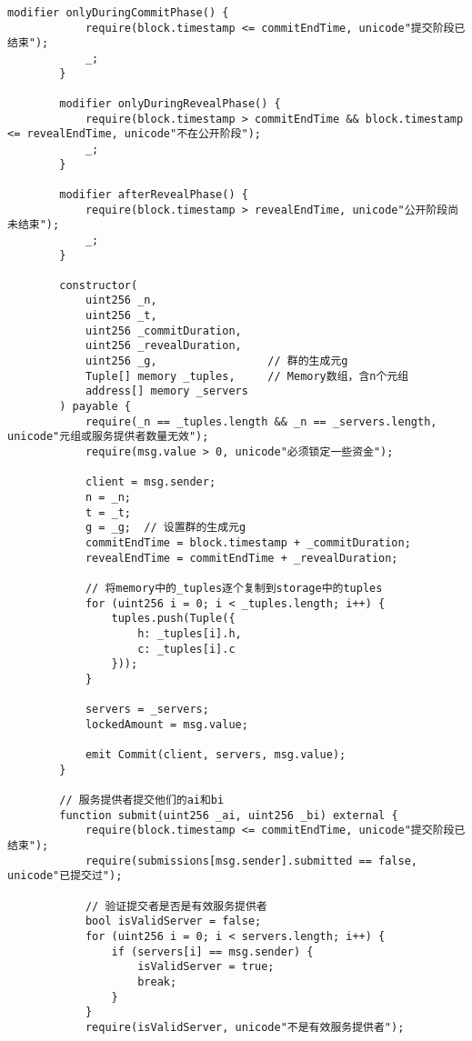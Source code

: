 \begin{lstlisting}[language=Solidity]
        modifier onlyDuringCommitPhase() {
            require(block.timestamp <= commitEndTime, unicode"提交阶段已结束");
            _;
        }
    
        modifier onlyDuringRevealPhase() {
            require(block.timestamp > commitEndTime && block.timestamp <= revealEndTime, unicode"不在公开阶段");
            _;
        }
    
        modifier afterRevealPhase() {
            require(block.timestamp > revealEndTime, unicode"公开阶段尚未结束");
            _;
        }
    
        constructor(
            uint256 _n,
            uint256 _t,
            uint256 _commitDuration,
            uint256 _revealDuration,
            uint256 _g,                 // 群的生成元g
            Tuple[] memory _tuples,     // Memory数组，含n个元组
            address[] memory _servers
        ) payable {
            require(_n == _tuples.length && _n == _servers.length, unicode"元组或服务提供者数量无效");
            require(msg.value > 0, unicode"必须锁定一些资金");
    
            client = msg.sender;
            n = _n;
            t = _t;
            g = _g;  // 设置群的生成元g
            commitEndTime = block.timestamp + _commitDuration;
            revealEndTime = commitEndTime + _revealDuration;
            
            // 将memory中的_tuples逐个复制到storage中的tuples
            for (uint256 i = 0; i < _tuples.length; i++) {
                tuples.push(Tuple({
                    h: _tuples[i].h,
                    c: _tuples[i].c
                }));
            }
    
            servers = _servers;
            lockedAmount = msg.value;
    
            emit Commit(client, servers, msg.value);
        }
    
        // 服务提供者提交他们的ai和bi
        function submit(uint256 _ai, uint256 _bi) external {
            require(block.timestamp <= commitEndTime, unicode"提交阶段已结束");
            require(submissions[msg.sender].submitted == false, unicode"已提交过");
    
            // 验证提交者是否是有效服务提供者
            bool isValidServer = false;
            for (uint256 i = 0; i < servers.length; i++) {
                if (servers[i] == msg.sender) {
                    isValidServer = true;
                    break;
                }
            }
            require(isValidServer, unicode"不是有效服务提供者");
    

\end{lstlisting}
